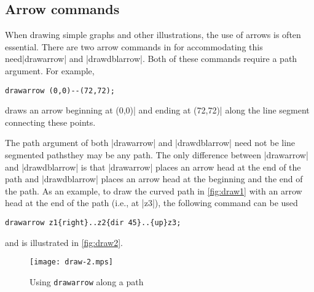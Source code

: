 \subsection{Arrow commands}

When drawing simple graphs and other illustrations, the use of arrows is
often essential.  There are two arrow commands in \MP{} for
accommodating this need\Dash |drawarrow| and |drawdblarrow|.  Both of
these commands require a path argument.  For example,

\begin{lstlisting}[style=MP]
drawarrow (0,0)--(72,72);
\end{lstlisting}
draws an arrow beginning at (0,0)| and ending at (72,72)| along the line
segment connecting these points.

The path argument of both |drawarrow| and |drawdblarrow| need not be
line segmented paths\Dash they may be any \MP{} path.  The only
difference between |drawarrow| and |drawdblarrow| is that |drawarrow|
places an arrow head at the end of the path and |drawdblarrow| places an
arrow head at the beginning and the end of the path.  As an example, to
draw the curved path in \autoref{fig:draw1} with an arrow head at the
end of the path (i.e., at |z3|), the following command can be used

\begin{lstlisting}[style=MP]
drawarrow z1{right}..z2{dir 45}..{up}z3;
\end{lstlisting}
and is illustrated in \autoref{fig:draw2}.

\begin{figure}
  \centering
  \texttt{[image: draw-2.mps]}
  \caption{Using \texttt{drawarrow} along a path}
  \label{fig:draw2}
\end{figure}
